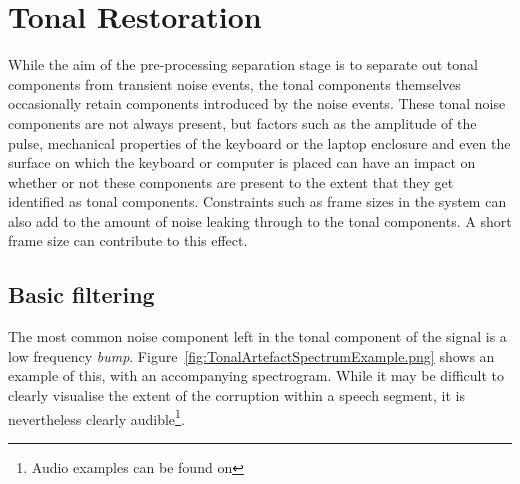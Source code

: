 %

\section{Tonal Restoration}\label{sec:TonalFiltering}
While the aim of the pre-processing separation stage is to separate out tonal components from transient noise events, the tonal components themselves occasionally retain components introduced by the noise events. These tonal noise components are not always present, but factors such as the amplitude of the pulse, mechanical properties of the keyboard or the laptop enclosure and even the surface on which the keyboard or computer is placed can have an impact on whether or not these components are present to the extent that they get identified as tonal components. Constraints such as frame sizes in the system can also add to the amount of noise leaking through to the tonal components. A short frame size can contribute to this effect.

\subsection{Basic filtering}\label{sec:TonalFiltering}
The most common noise component left in the tonal component of the signal is a low frequency \emph{bump}. Figure~\ref{fig:TonalArtefactSpectrumExample.png} shows an example of this, with an accompanying spectrogram. While it may be difficult to clearly visualise the extent of the corruption within a speech segment, it is nevertheless clearly audible\footnote{Audio examples can be found on \siteURL}.

